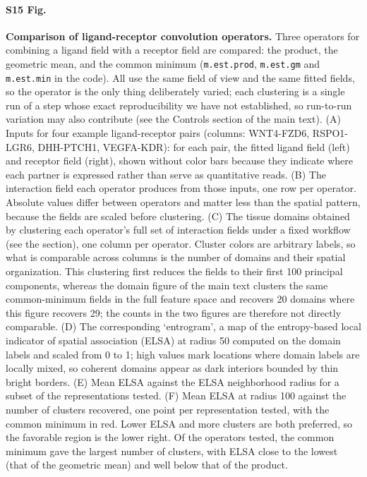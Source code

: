 \documentclass[10pt,letterpaper]{article}
\begin{document}
\paragraph*{S15 Fig.}
\label{S15_Fig}
\textbf{Comparison of ligand-receptor convolution operators.} Three operators for combining a ligand field with a receptor field are compared: the product, the geometric mean, and the common minimum (\texttt{m.est.prod}, \texttt{m.est.gm} and \texttt{m.est.min} in the code). All use the same field of view and the same fitted fields, so the operator is the only thing deliberately varied; each clustering is a single run of a step whose exact reproducibility we have not established, so run-to-run variation may also contribute (see the Controls section of the main text). (A) Inputs for four example ligand-receptor pairs (columns: WNT4-FZD6, RSPO1-LGR6, DHH-PTCH1, VEGFA-KDR): for each pair, the fitted ligand field (left) and receptor field (right), shown without color bars because they indicate where each partner is expressed rather than serve as quantitative reads. (B) The interaction field each operator produces from those inputs, one row per operator. Absolute values differ between operators and matter less than the spatial pattern, because the fields are scaled before clustering. (C) The tissue domains obtained by clustering each operator's full set of interaction fields under a fixed workflow (see the  section), one column per operator. Cluster colors are arbitrary labels, so what is comparable across columns is the number of domains and their spatial organization. This clustering first reduces the fields to their first 100 principal components, whereas the domain figure of the main text clusters the same common-minimum fields in the full feature space and recovers 20 domains where this figure recovers 29; the counts in the two figures are therefore not directly comparable. (D) The corresponding `entrogram', a map of the entropy-based local indicator of spatial association (ELSA) \cite{naimi2019elsa} at radius 50 computed on the domain labels and scaled from 0 to 1; high values mark locations where domain labels are locally mixed, so coherent domains appear as dark interiors bounded by thin bright borders. (E) Mean ELSA against the ELSA neighborhood radius for a subset of the representations tested. (F) Mean ELSA at radius 100 against the number of clusters recovered, one point per representation tested, with the common minimum in red. Lower ELSA and more clusters are both preferred, so the favorable region is the lower right. Of the operators tested, the common minimum gave the largest number of clusters, with ELSA close to the lowest (that of the geometric mean) and well below that of the product.
\end{document}
